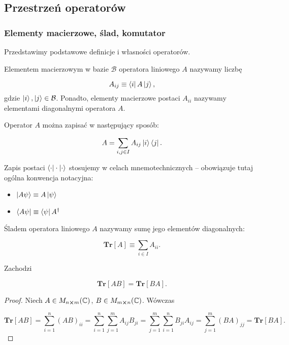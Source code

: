 \subsection{Przestrzeń operatorów}

\subsubsection{Elementy macierzowe, ślad, komutator}

Przedstawimy podstawowe definicje i własności operatorów.

\begin{definition}
    \label{definition:matrix-element}
    Elementem macierzowym w bazie $\mathcal{B}$ operatora liniowego $A$ nazywamy liczbę

    $$
        A_{ij} \equiv \bra{i} A \ket{j},
    $$
    gdzie $\ket{i}, \ket{j} \in \mathcal{B}$. Ponadto, elementy macierzowe postaci $A_{ii}$ nazywamy elementami diagonalnymi operatora $A$.
\end{definition}

Operator $A$ można zapisać w następujący sposób:

$$
    A = \sum\limits_{i, j \in I} A_{ij} \ket{i}\bra{j}.
$$

\begin{remark}
    Zapis postaci $\bra{\cdot}\cdot\ket{\cdot}$ stosujemy w celach mnemotechnicznych -- obowiązuje tutaj ogólna konwencja notacyjna:

    \begin{itemize}
        \item $\ket{A \psi} \equiv A \ket{\psi}$
        \item $\bra{A \psi} \equiv \bra{\psi} A ^ {\dag}$
    \end{itemize}
\end{remark}

\begin{definition}
    Śladem operatora liniowego $A$ nazywamy sumę jego elementów diagonalnych:

    $$
        \textbf{Tr}[A] \equiv \sum\limits_{i \in I} A_{ii}.
    $$
\end{definition}

\begin{theorem}
    Zachodzi

    $$
        \textbf{Tr}[AB] = \textbf{Tr}[BA].
    $$
\end{theorem}

\begin{proof}
    Niech $A \in M_{n \boldsymbol\times m}(\mathbb{C})$, $B \in M_{m \boldsymbol\times n}(\mathbb{C})$. Wówczas

    $$
        \textbf{Tr}[AB] = \sum\limits_{i = 1}^{n} (AB)_{ii} = \sum\limits_{i = 1}^{n} \sum\limits_{j = 1} ^ {m} A_{ij} B_{ji} = \sum\limits_{j = 1} ^{m} \sum\limits_{i = 1} ^{n} B_{ji} A_{ij} = \sum\limits_{j = 1} ^ {m} (BA)_{jj} = \textbf{Tr}[BA].
    $$
\end{proof}

